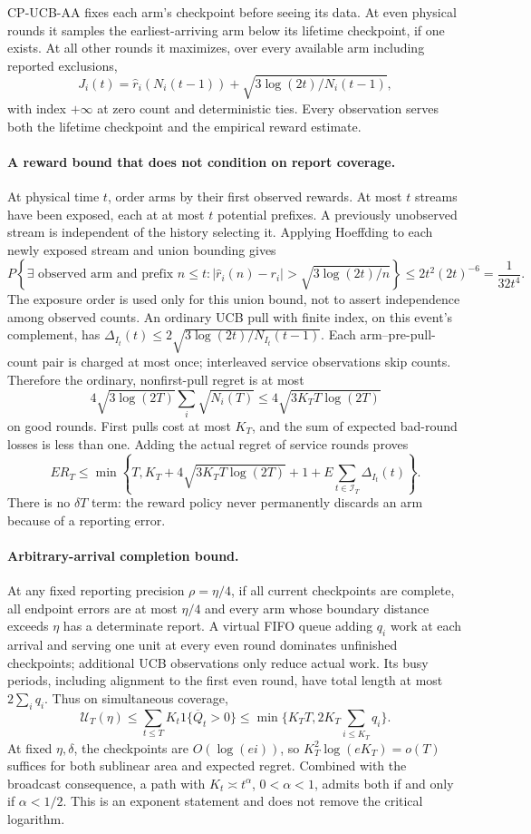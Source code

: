 CP-UCB-AA fixes each arm's checkpoint before seeing its data. At even
physical rounds it samples the earliest-arriving arm below its lifetime
checkpoint, if one exists. At all other rounds it maximizes, over every
available arm including reported exclusions,
\[
 J_i(t)=\hat r_i(N_i(t-1))+
             \sqrt{3\log(2t)/N_i(t-1)},
\]
with index $+\infty$ at zero count and deterministic ties. Every observation
serves both the lifetime checkpoint and the empirical reward estimate.

\paragraph{A reward bound that does not condition on report coverage.}
At physical time $t$, order arms by their first observed rewards. At most
$t$ streams have been exposed, each at at most $t$ potential prefixes. A
previously unobserved stream is independent of the history selecting it.
Applying Hoeffding to each newly exposed stream and union bounding gives
\[
 P\left\{\exists\text{ observed arm and prefix }n\le t:
 |\hat r_i(n)-r_i|>
        \sqrt{3\log(2t)/n}\right\}
 \le2t^2(2t)^{-6}=\frac1{32t^4}.
\]
The exposure order is used only for this union bound, not to assert
independence among observed counts. An ordinary UCB pull with finite index,
on this event's complement, has
$\Delta_{I_t}(t)\le2\sqrt{3\log(2t)/N_{I_t}(t-1)}$.
Each arm--pre-pull-count pair is charged at most once; interleaved service
observations skip counts. Therefore the ordinary, nonfirst-pull regret is
at most
\[
 4\sqrt{3\log(2T)}\sum_i\sqrt{N_i(T)}
 \le4\sqrt{3K_TT\log(2T)}
\]
on good rounds. First pulls cost at most $K_T$, and the sum of expected
bad-round losses is less than one. Adding the actual regret of service
rounds proves
\[
 ER_T\le\min\left\{T,K_T+4\sqrt{3K_TT\log(2T)}+1+
       E\sum_{t\in\mathcal I_T}\Delta_{I_t}(t)\right\}.
\]
There is no $\delta T$ term: the reward policy never permanently discards an
arm because of a reporting error.

\paragraph{Arbitrary-arrival completion bound.}
At any fixed reporting precision $\rho=\eta/4$, if all current checkpoints
are complete, all endpoint errors are at most $\eta/4$ and every arm whose
boundary distance exceeds $\eta$ has a determinate report. A virtual FIFO
queue adding $q_i$ work at each arrival and serving one unit at every even
round dominates unfinished checkpoints; additional UCB observations only
reduce actual work. Its busy periods, including alignment to the first even
round, have total length at most $2\sum_iq_i$. Thus on simultaneous coverage,
\[
 \mathcal U_T(\eta)\le
 \sum_{t\le T}K_t1\{\overline Q_t>0\}
 \le\min\{K_TT,2K_T\sum_{i\le K_T}q_i\}.
\]
At fixed $\eta,\delta$, the checkpoints are $O(\log(ei))$, so
$K_T^2\log(eK_T)=o(T)$ suffices for both sublinear area and expected regret.
Combined with the broadcast consequence, a path with
$K_t\asymp t^\alpha$, $0<\alpha<1$, admits both if and only if $\alpha<1/2$.
This is an exponent statement and does not remove the critical logarithm.

